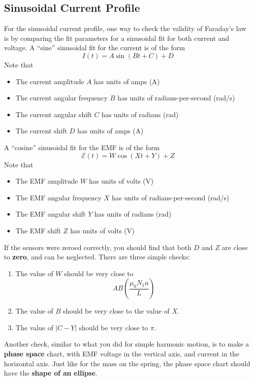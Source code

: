 \subsection{Sinusoidal Current Profile}
For the sinusoidal current profile, one way to check the validity of Faraday's law is by comparing the fit parameters for a sinusoidal fit for both current and voltage. A ``sine'' sinusoidal fit for the current is of the form
\begin{equation}
	I(t) = A \sin\left(B t + C\right) + D
\end{equation}
Note that
\begin{itemize}
	\item The current amplitude $A$ has units of amps (A)
	\item The current angular frequency $B$ has units of radians-per-second (rad/s)
	\item The current angular shift $C$ has units of radians (rad)
	\item The current shift $D$ has units of amps (A)
\end{itemize}
A ``cosine'' sinusoidal fit for the EMF is of the form
\begin{equation}
	\mathcal{E}(t) = W \cos\left(X t + Y\right) + Z
\end{equation}
Note that
\begin{itemize}
	\item The EMF amplitude $W$ has units of volts (V)
	\item The EMF angular frequency $X$ has units of radians-per-second (rad/s)
	\item The EMF angular shift $Y$ has units of radians (rad)
	\item The EMF shift $Z$ has units of volts (V)
\end{itemize}
If the sensors were zeroed correctly, you should find that both $D$ and $Z$ are close to \textbf{zero}, and can be neglected. There are three simple checks:
\begin{enumerate}
	\item The value of $W$ should be very close to
	\begin{equation}
		A B \left(\frac{\mu_{0} N_{1} a}{L}\right)
	\end{equation}
	\item The value of $B$ should be very close to the value of $X$.
	\item The value of $\vert C - Y \vert$ should be very close to $\pi$.
\end{enumerate}
Another check, similar to what you did for simple harmonic motion, is to make a \textbf{phase space} chart, with EMF voltage in the vertical axis, and current in the horizontal axis. Just like for the mass on the spring, the phase space chart should have the \textbf{shape of an ellipse}.
